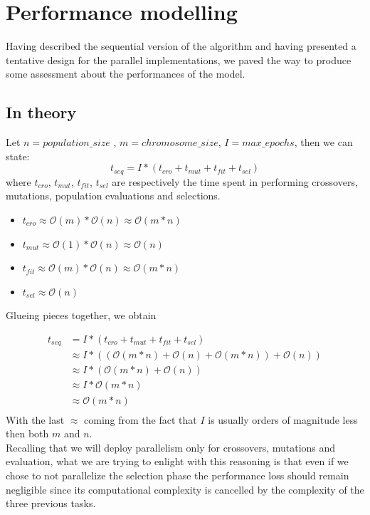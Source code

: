 \documentclass[11pt]{article}
\begin{document}
\section{Performance modelling}
Having described the sequential version of the algorithm and having presented a tentative design for the parallel implementations, we paved the way to produce some assessment about the performances of the model.
\subsection{In theory}
Let $ n = population\_size$ , $m=chromosome\_size$, $ I = max\_epochs $, then we can state:
\[t_{seq} = I * (t_{cro} + t_{mut} + t_{fit} + t_{sel}) \]
where $ t_{cro}$, $ t_{mut}$, $t_{fit}$, $t_{sel}$ are respectively the time spent in performing crossovers, mutations, population evaluations and selections.
\\ \medskip
\begin{itemize}
	\item $ t_{cro} \approx \mathcal{O}(m) * \mathcal{O}(n) \approx \mathcal{O}(m*n) $
	\item $ t_{mut} \approx \mathcal{O}(1) * \mathcal{O}(n) \approx \mathcal{O}(n) $
	\item $ t_{fit} \approx \mathcal{O}(m) * \mathcal{O}(n) \approx \mathcal{O}(m*n) $
	\item $ t_{sel} \approx \mathcal{O}(n)$
\end{itemize}
Glueing pieces together, we obtain

\begin{align*}
t_{seq} &= I * (t_{cro} + t_{mut} + t_{fit} + t_{sel}) \\
& \approx I * ((\mathcal{O}(m*n) + \mathcal{O}(n) + \mathcal{O}(m*n)) + \mathcal{O}(n))\\
& \approx I * (\mathcal{O}(m*n) + \mathcal{O}(n)) \\
& \approx I * \mathcal{O}(m*n) \\
& \approx \mathcal{O}(m*n)\\
\end{align*}
With the last $ \approx $ coming from the fact that $ I $ is usually orders of magnitude less then both $ m $ and $ n $. \\
Recalling that we will deploy parallelism only for crossovers, mutations and evaluation,
what we are trying to enlight with this reasoning is that even if we chose to not parallelize the selection phase the performance loss should remain negligible since its computational complexity is cancelled by the complexity of the three previous tasks.
\end{document}
